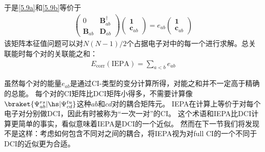 \addtocounter{equation}{1}
于是\autoref{5.9a}和\autoref{5.9b}等价于
\begin{align}
    \begin{pmatrix}
        0 & \mathbf{B}^\dagger_{ab} \\
        \mathbf{B}_{ab} & \mathbf{D}_{ab}
    \end{pmatrix}
    \begin{pmatrix}
        \mathbf{1} \\
        \mathbf{c}_{ab}
    \end{pmatrix}
    =e_{ab}
    \begin{pmatrix}
        \mathbf{1} \\
        \mathbf{c}_{ab}
    \end{pmatrix}
\end{align}
该矩阵本征值问题可以对$N(N-1)/2$个占据电子对中的每一个进行求解。总关联能时每个对的关联能之和：
\begin{align}
    E_\text{corr}(\text{IEPA})=\sum_{a<b}e_{ab}
\end{align}

虽然每个对的能量$e_{ab}$是通过CI-类型的变分计算所得，对能之和并不一定高于精确的总能。
每个对的CI矩阵比DCI矩阵小得多，不需要计算像$\braket{\Psi^{rs}_{ab}|\hs|\Psi^{tu}_{cd}}$这种$ab$和$cd$对的耦合矩阵元。
IEPA在计算上等价于对每个电子对分别做DCI，因此有时被称为“一次一对”的CI。
这个术语和IEPA比DCI计算更简单的事实，看似意味着IEPA是DCI的一个近似。
然而在下一节我们将发现不是这样：考虑如何包含不同对之间的耦合，将IEPA视为对full CI的一个不同于DCI的近似更为合适。

